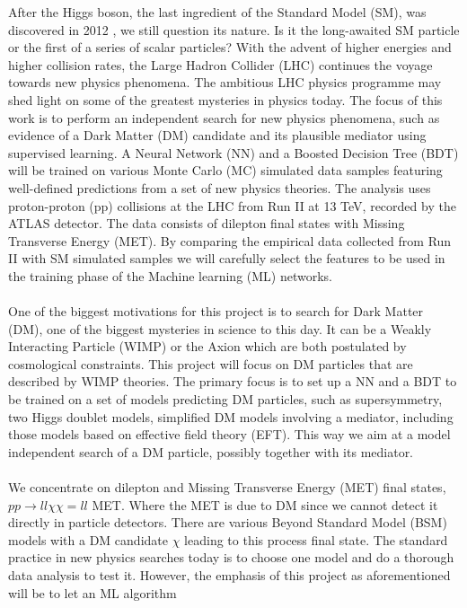 \documentclass[12pt, a4paper]{book}
\begin{document}
After the Higgs boson, the last ingredient of the Standard Model (SM), was discovered in 2012 \cite{Higgs_discovery_2012}, we still question its nature. Is it the long-awaited SM particle or the first of a series of scalar particles? 
With the advent of higher energies and higher collision rates, the Large Hadron Collider (LHC) continues the voyage towards new physics phenomena. The ambitious LHC physics programme may shed light on some of the greatest mysteries in physics today. 
The focus of this work is to perform an independent search for new physics phenomena, such as evidence of a Dark Matter (DM) candidate and its plausible mediator using supervised learning. A Neural Network (NN) and a Boosted Decision Tree (BDT) will 
be trained on various Monte Carlo (MC) simulated data samples featuring well-defined predictions from a set of new physics theories. The analysis uses proton-proton (pp) collisions at the LHC from Run II at 13 TeV, recorded by the ATLAS detector. 
The data consists of dilepton final states with Missing Transverse Energy (MET). By comparing the empirical data collected from Run II with SM simulated samples we will carefully select the features to be used in the training phase of the Machine learning 
(ML) networks. \\
\\ One of the biggest motivations for this project is to search for Dark Matter (DM), one of the biggest mysteries in science to this day. It can be a Weakly Interacting Particle (WIMP) \cite{WIMP} or the Axion \cite{Axion} which are both postulated by cosmological constraints. 
This project will focus on DM particles that are described by WIMP theories. The primary focus is to set up a NN and a BDT to be trained on a set of models predicting DM particles, such as supersymmetry, two Higgs doublet models, simplified DM models involving a mediator, including those 
models based on effective field theory (EFT). This way we aim at a model independent search of a DM particle, possibly together with its mediator.\\
\\ We concentrate on dilepton and Missing Transverse Energy (MET) final states, $pp\rightarrow ll \chi\chi = ll$ MET. Where the MET is due to DM since we cannot detect it directly in particle detectors. There are various Beyond Standard Model (BSM) models 
with a DM candidate $\chi$ leading to this process final state. The standard practice in new physics searches today is to choose one model and do a thorough data analysis to test it. However, the emphasis of this project as aforementioned will be to let an ML algorithm 
\end{document}
